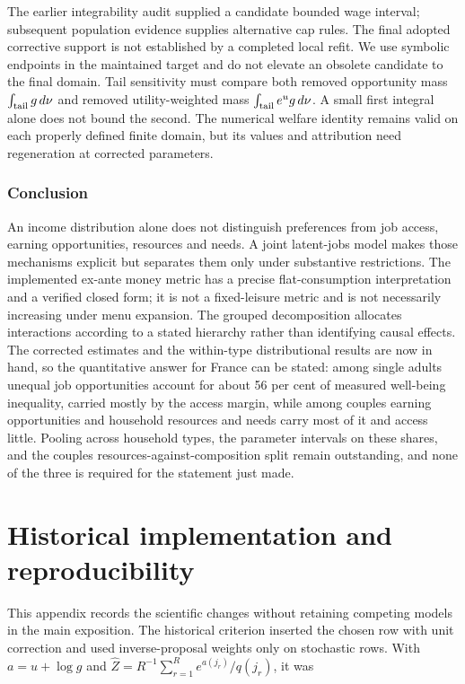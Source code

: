 \documentclass[11pt,a4paper]{article}
\begin{document}
The earlier integrability audit supplied a candidate bounded wage interval; subsequent population evidence supplies alternative cap rules. The final adopted corrective support is not established by a completed local refit. We use symbolic endpoints in the maintained target and do not elevate an obsolete candidate to the final domain. Tail sensitivity must compare both removed opportunity mass \(\int_{\rm tail}g\,d\nu\) and removed utility-weighted mass \(\int_{\rm tail}e^ug\,d\nu\). A small first integral alone does not bound the second. The numerical welfare identity remains valid on each properly defined finite domain, but its values and attribution need regeneration at corrected parameters.

\subsubsection{Conclusion}\label{conclusion}

An income distribution alone does not distinguish preferences from job access, earning opportunities, resources and needs. A joint latent-jobs model makes those mechanisms explicit but separates them only under substantive restrictions. The implemented ex-ante money metric has a precise flat-consumption interpretation and a verified closed form; it is not a fixed-leisure metric and is not necessarily increasing under menu expansion. The grouped decomposition allocates interactions according to a stated hierarchy rather than identifying causal effects. The corrected estimates and the within-type distributional results are now in hand, so the quantitative answer for France can be stated: among single adults unequal job opportunities account for about 56 per cent of measured well-being inequality, carried mostly by the access margin, while among couples earning opportunities and household resources and needs carry most of it and access little. Pooling across household types, the parameter intervals on these shares, and the couples resources-against-composition split remain outstanding, and none of the three is required for the statement just made.

\appendix

\section{Historical implementation and reproducibility}\label{historical-implementation-and-reproducibility}

This appendix records the scientific changes without retaining competing models in the main exposition. The historical criterion inserted the chosen row with unit correction and used inverse-proposal weights only on stochastic rows. With \(a=u+\log g\) and \(\widehat Z=R^{-1}\sum_{r=1}^R e^{a(j_r)}/q(j_r)\), it was
\end{document}
